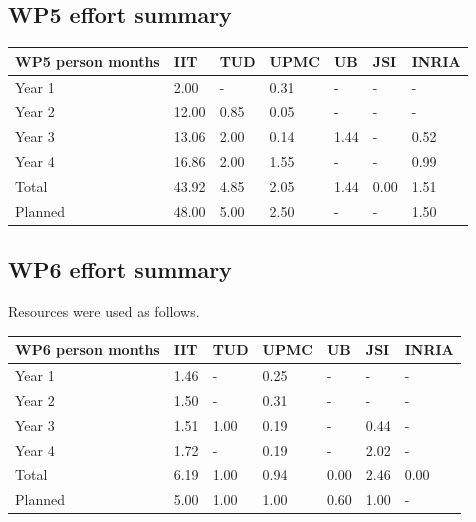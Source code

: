 \documentclass[12pt,a4paper,twoside]{article}
\begin{document}
\subsection{WP5 effort summary}
\begin{center}
\begin{tabular}{|C{1.5cm}|C{1.5cm}|C{1.5cm}|C{2cm}|C{2cm}|C{2cm}|C{2cm}|}
\hline
\footnotesize \textbf{WP5 person months}& \footnotesize \textbf{IIT}&\footnotesize \textbf{TUD}&\footnotesize \textbf{UPMC}& \footnotesize \textbf{UB} &\footnotesize \textbf{JSI} & \footnotesize \textbf{INRIA} \\ \hline
\footnotesize Year 1  &  2.00  & -    & 0.31 & -    & - & -     \\  \hline
\footnotesize Year 2  &  12.00 & 0.85 & 0.05 & -    & - & -     \\  \hline
\footnotesize Year 3  &  13.06 & 2.00 & 0.14 & 1.44 & - & 0.52 \\ \hline
\footnotesize Year 4  & 16.86 &  2.00 &  1.55 &  -     &  -     &  0.99 \\   \hline
\footnotesize Total & 43.92 &  4.85 &  2.05 &  1.44 &  0.00 &  1.51    \\
\hline \hline
\footnotesize Planned &  48.00 & 5.00 & 2.50 & - & - & 1.50 \\ \hline
\end{tabular}
\end{center}

\subsection{WP6 effort summary}
Resources were used as follows.

\begin{center}
\begin{tabular}{|C{1.5cm}|C{1.5cm}|C{1.5cm}|C{2cm}|C{2cm}|C{2cm}|C{2cm}|}
\hline
\footnotesize \textbf{WP6 person months}& \footnotesize \textbf{IIT}&\footnotesize \textbf{TUD}&\footnotesize \textbf{UPMC}& \footnotesize \textbf{UB} &\footnotesize \textbf{JSI} & \footnotesize \textbf{INRIA} \\ \hline
\footnotesize Year 1 &  1.46 & - & 0.25 & - & - & -    \\  \hline
\footnotesize Year 2 &  1.50 & - & 0.31 & - & - & -     \\  \hline
\footnotesize Year 3 &  1.51 & 1.00 & 0.19 & - & 0.44 & - \\ \hline
\footnotesize Year 4  & 1.72  &  -    &  0.19 &  -     &  2.02  &  -  \\   \hline
\footnotesize Total & 6.19  &  1.00 &  0.94 &  0.00  &  2.46 &  0.00    \\
\hline \hline
\footnotesize Planned &  5.00 & 1.00 & 1.00 & 0.60 & 1.00 & - \\ \hline
\end{tabular}
\end{center}
\end{document}
